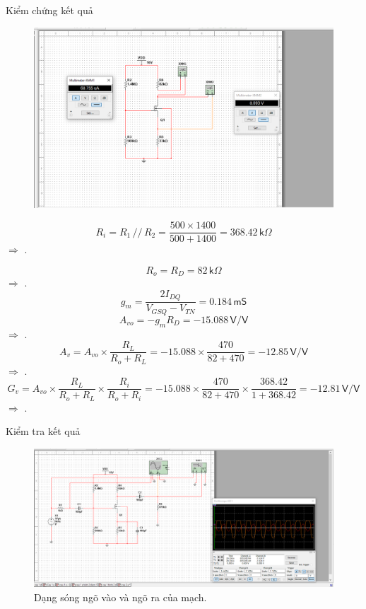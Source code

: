 Kiểm chứng kết quả

\begin{figure}[H]
	\centering
	\includegraphics[width=\linewidth]{./my-chapters/my-images/Question1/Câu 1 Hình 1 a - Điểm Q.png}
\end{figure}


\[
R_{i}=R_{1}\,//\,R_{2}=\frac{500\times1400}{500+1400}=368.42\,\textsf{k}\Omega
\]
$\Rightarrow$ .

\[
R_{o}=R_{D}=82\,\textsf{k}\Omega
\]
$\Rightarrow$ .
\[
g_{m}=\frac{2I_{DQ}}{V_{GSQ}-V_{TN}}=0.184\,\textsf{mS}
\]
\[
A_{vo}=-g_{m}R_{D}=-15.088\,\textsf{V/V}
\]
$\Rightarrow$ .
\[
A_{v}=A_{vo}\times\frac{R_{L}}{R_{o}+R_{L}}=-15.088\times\frac{470}{82+470}=-12.85\,\textsf{V/V}
\]
$\Rightarrow$ .
\[
G_{v}=A_{vo}\times\frac{R_{L}}{R_{o}+R_{L}}\times\frac{R_{i}}{R_{o}+R_{i}}=-15.088\times\frac{470}{82+470}\times\frac{368.42}{1+368.42}=-12.81\,\textsf{V/V}
\]
$\Rightarrow$ .

Kiểm tra kết quả

\begin{figure}[H]
	\centering
	\includegraphics[width=\linewidth]{./my-chapters/my-images/Question1/Câu 1 Hình 1 b - Sóng.png}
	\caption{Dạng sóng ngõ vào và ngõ ra của mạch.}
\end{figure}


